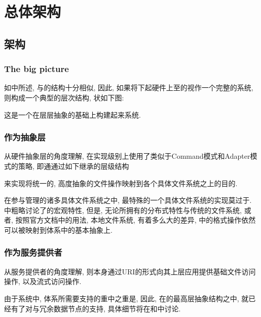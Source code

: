 \chapter{\HFS 总体架构}
\label{ch:hfs}

\section{\HFS 架构}
\label{sec:hfs:arch}

\subsection{The big picture}
\label{ssec:hfs:bigpic}

如中所述, {\HFS}与{\VFS}的结构十分相似,
因此, 如果将下起硬件上至{\HFS}的视作一个完整的系统, 则{\HFS}构成一个典型的层次结构,
状如下图:


这是一个在层层抽象的基础上构建起来系统.


\subsection{作为抽象层}
\label{ssec:hfs:al}

从硬件抽象层的角度理解{\HFS},
{\HFS}在实现级别上使用了类似于Command模式和Adapter模式的策略,
即通通过如下继承的层级结构


来实现将统一的, 高度抽象的文件操作映射到各个具体文件系统之上的目的.

在{\HFS}参与管理的诸多具体文件系统之中, 最特殊的一个具体文件系统的实现莫过于{\HDFS}.
中粗略讨论了{\HDFS}的宏观特性,
但是, 无论{\HDFS}所拥有的分布式特性与传统的文件系统, 或者, 按照官方文档中的用法, 本地文件系统,
有着多么大的差异, {\HDFS}中的格式操作依然可以被映射到{\HFS}体系中的基本抽象上.


\subsection{作为服务提供者}
\label{ssec:hfs:srv}

从服务提供者的角度理解{\HFS}, 则{\HFS}本身通过URI的形式向其上层应用提供基础文件访问操作,
以及流式访问操作.

由于{\Hadoop}系统中, {\HFS}体系所需要支持的重中之重是{\HDFS}, 因此,
在{\HFS}的最高层抽象结构之中, 就已经有了对与冗余数据节点的支持,
具体细节将在和中讨论.


